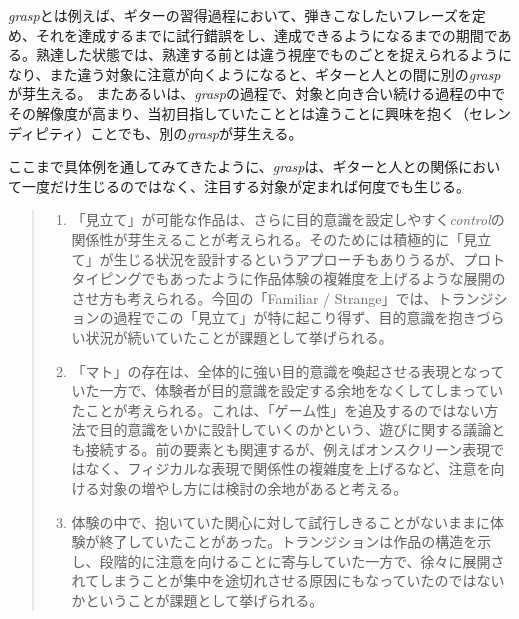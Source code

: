 \textit{grasp}とは例えば、ギターの習得過程において、弾きこなしたいフレーズを定め、それを達成するまでに試行錯誤をし、達成できるようになるまでの期間である。熟達した状態では、熟達する前とは違う視座でものごとを捉えられるようになり、また違う対象に注意が向くようになると、ギターと人との間に別の\textit{grasp}が芽生える。
またあるいは、\textit{grasp}の過程で、対象と向き合い続ける過程の中でその解像度が高まり、当初目指していたこととは違うことに興味を抱く（セレンディピティ）ことでも、別の\textit{grasp}が芽生える。

ここまで具体例を通してみてきたように、\textit{grasp}は、ギターと人との関係において一度だけ生じるのではなく、注目する対象が定まれば何度でも生じる。


\begin{quote}
  \begin{enumerate}
    \item 「見立て」が可能な作品は、さらに目的意識を設定しやすく\textit{control}の関係性が芽生えることが考えられる。そのためには積極的に「見立て」が生じる状況を設計するというアプローチもありうるが、プロトタイピングでもあったように作品体験の複雑度を上げるような展開のさせ方も考えられる。今回の「Familiar / Strange」では、トランジションの過程でこの「見立て」が特に起こり得ず、目的意識を抱きづらい状況が続いていたことが課題として挙げられる。
    \item 「マト」の存在は、全体的に強い目的意識を喚起させる表現となっていた一方で、体験者が目的意識を設定する余地をなくしてしまっていたことが考えられる。これは、「ゲーム性」を追及するのではない方法で目的意識をいかに設計していくのかという、遊びに関する議論とも接続する。前の要素とも関連するが、例えばオンスクリーン表現ではなく、フィジカルな表現で関係性の複雑度を上げるなど、注意を向ける対象の増やし方には検討の余地があると考える。
    \item 体験の中で、抱いていた関心に対して試行しきることがないままに体験が終了していたことがあった。トランジションは作品の構造を示し、段階的に注意を向けることに寄与していた一方で、徐々に展開されてしまうことが集中を途切れさせる原因にもなっていたのではないかということが課題として挙げられる。
  \end{enumerate}
\end{quote}